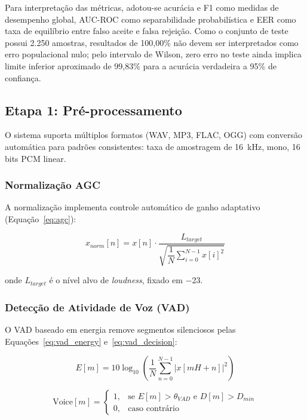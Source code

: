 \documentclass[12pt,a4paper]{article}
\begin{document}
Para interpretação das métricas, adotou-se acurácia e F1 como medidas de
desempenho global, AUC-ROC como separabilidade probabilística e EER como taxa
de equilíbrio entre falso aceite e falsa rejeição. Como o conjunto de teste
possui 2.250 amostras, resultados de 100,00\% não devem ser interpretados como
erro populacional nulo; pelo intervalo de Wilson, zero erro no teste ainda
implica limite inferior aproximado de 99,83\% para a acurácia verdadeira a 95\%
de confiança.

\subsection{Etapa 1: Pré-processamento}

O sistema suporta múltiplos formatos (WAV, MP3, FLAC, OGG) com conversão
automática para padrões consistentes: taxa de amostragem de \SI{16}{\kilo\hertz},
mono, 16 bits PCM linear.

\subsubsection{Normalização AGC}

A normalização implementa controle automático de ganho adaptativo
(Equação~\ref{eq:agc}):

\begin{equation}
\label{eq:agc}
x_{norm}[n] = x[n] \cdot
\frac{L_{target}}{\sqrt{\dfrac{1}{N}\displaystyle\sum_{i=0}^{N-1}x[i]^2}}
\end{equation}

\noindent
onde $L_{target}$ é o nível alvo de \textit{loudness}, fixado em \SI{-23}{\lufs}.

\subsubsection{Detecção de Atividade de Voz (VAD)}

O VAD baseado em energia remove segmentos silenciosos pelas
Equações~\ref{eq:vad_energy} e~\ref{eq:vad_decision}:

\begin{equation}
\label{eq:vad_energy}
E[m] = 10\log_{10}\!\left(\frac{1}{N}\sum_{n=0}^{N-1}|x[mH+n]|^2\right)
\end{equation}

\begin{equation}
\label{eq:vad_decision}
\text{Voice}[m] = \begin{cases}
1, & \text{se } E[m] > \theta_{VAD} \text{ e } D[m] > D_{min}\\
0, & \text{caso contrário}
\end{cases}
\end{equation}
\end{document}

